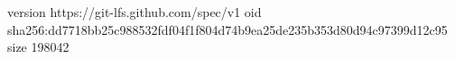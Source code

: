 version https://git-lfs.github.com/spec/v1
oid sha256:dd7718bb25c988532fdf04f1f804d74b9ea25de235b353d80d94c97399d12c95
size 198042

